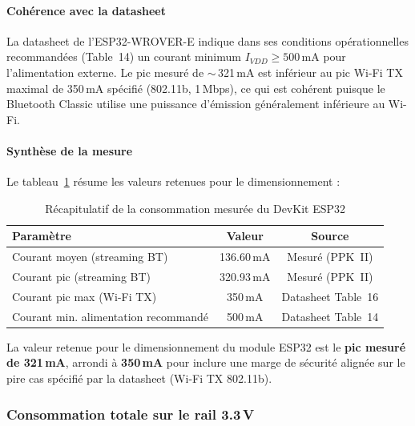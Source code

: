\paragraph{Cohérence avec la datasheet}
La datasheet de l'ESP32-WROVER-E indique dans ses conditions opérationnelles recommandées (Table~14) un courant minimum $I_{VDD} \geq 500$\,mA pour l'alimentation externe. Le pic mesuré de $\sim$\,321\,mA est inférieur au pic Wi-Fi TX maximal de 350\,mA spécifié (802.11b, 1\,Mbps), ce qui est cohérent puisque le Bluetooth Classic utilise une puissance d'émission généralement inférieure au Wi-Fi.

\paragraph{Synthèse de la mesure}

Le tableau~\ref{tab:mesure_esp32} résume les valeurs retenues pour le dimensionnement :

\begin{table}[H]
    \centering
    \caption{Récapitulatif de la consommation mesurée du DevKit ESP32}
    \label{tab:mesure_esp32}
    \begin{tabular}{l c c}
        \hline
        \textbf{Paramètre}                   & \textbf{Valeur} & \textbf{Source}    \\
        \hline
        Courant moyen (streaming BT)         & 136.60\,mA      & Mesuré (PPK~II)    \\
        Courant pic (streaming BT)           & 320.93\,mA      & Mesuré (PPK~II)    \\
        Courant pic max (Wi-Fi TX)           & 350\,mA         & Datasheet Table~16 \\
        Courant min. alimentation recommandé & 500\,mA         & Datasheet Table~14 \\
        \hline
    \end{tabular}
\end{table}

La valeur retenue pour le dimensionnement du module ESP32 est le \textbf{pic mesuré de 321\,mA}, arrondi à \textbf{350\,mA} pour inclure une marge de sécurité alignée sur le pire cas spécifié par la datasheet (Wi-Fi TX 802.11b).

\subsubsection{Consommation totale sur le rail 3.3\,V}

